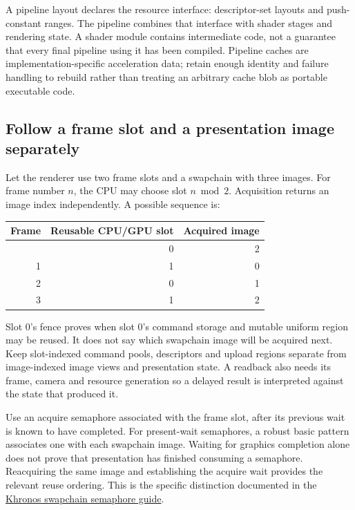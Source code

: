 A pipeline layout declares the resource interface: descriptor-set layouts and push-constant ranges. The pipeline combines that interface with shader stages and rendering state. A shader module contains intermediate code, not a guarantee that every final pipeline using it has been compiled. Pipeline caches are implementation-specific acceleration data; retain enough identity and failure handling to rebuild rather than treating an arbitrary cache blob as portable executable code.

\subsection{Follow a frame slot and a presentation image separately}\label{01-foundations-i-ch011-follow-a-frame-slot-and-a-presentation-image-separately}

Let the renderer use two frame slots and a swapchain with three images. For frame number \(n\), the CPU may choose slot \(n\bmod2\). Acquisition returns an image index independently. A possible sequence is:

{\def\LTcaptype{none} %
\begin{longtable}[]{@{}rrr@{}}
\toprule\noalign{}
Frame & Reusable CPU/GPU slot & Acquired image \\
\midrule\noalign{}
\endhead
\bottomrule\noalign{}
\endlastfoot
0 & 0 & 2 \\
1 & 1 & 0 \\
2 & 0 & 1 \\
3 & 1 & 2 \\
\end{longtable}
}

Slot 0's fence proves when slot 0's command storage and mutable uniform region may be reused. It does not say which swapchain image will be acquired next. Keep slot-indexed command pools, descriptors and upload regions separate from image-indexed image views and presentation state. A readback also needs its frame, camera and resource generation so a delayed result is interpreted against the state that produced it.

Use an acquire semaphore associated with the frame slot, after its previous wait is known to have completed. For present-wait semaphores, a robust basic pattern associates one with each swapchain image. Waiting for graphics completion alone does not prove that presentation has finished consuming a semaphore. Reacquiring the same image and establishing the acquire wait provides the relevant reuse ordering. This is the specific distinction documented in the \href{https://docs.vulkan.org/guide/latest/swapchain_semaphore_reuse.html}{Khronos swapchain semaphore guide}.

